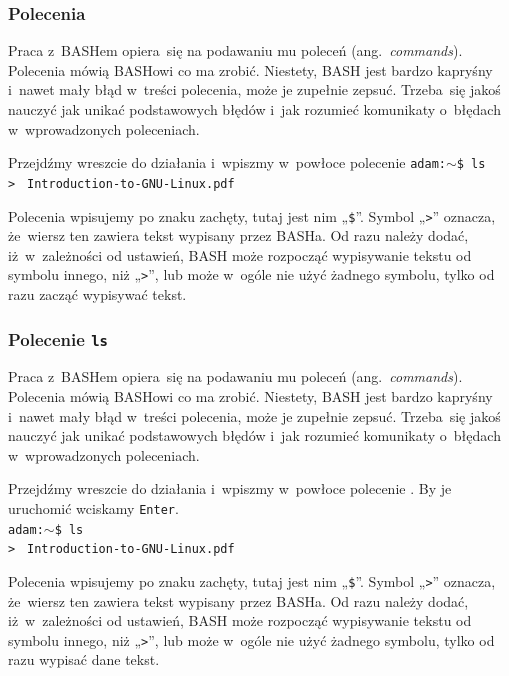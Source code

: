 \documentclass[10pt,t]{beamer}
\begin{document}
\begin{frame}
  \frametitle{Polecenia}


  Praca z~BASHem opiera~się na podawaniu mu poleceń
  (ang.~\textit{commands}). Polecenia mówią BASHowi co ma zrobić.
  Niestety, BASH jest bardzo kapryśny i~nawet mały błąd w~treści polecenia,
  może je zupełnie zepsuć. Trzeba~się jakoś nauczyć jak unikać podstawowych
  błędów i~jak rozumieć komunikaty o~błędach w~wprowadzonych poleceniach.

  Przejdźmy wreszcie do działania i~wpiszmy w~powłoce polecenie
  \texttt{adam:$\sim$\$ ls} \\
  \texttt{> } \quad
  \texttt{Introduction-to-GNU-Linux.pdf} \quad
  \texttt{}

  Polecenia wpisujemy po znaku zachęty, tutaj jest nim „\texttt{\$}”.
  Symbol „\texttt{>}” oznacza, że~wiersz ten zawiera tekst wypisany przez
  BASHa. Od razu należy dodać, iż~w~zależności od ustawień, BASH
  może rozpocząć wypisywanie tekstu od symbolu innego, niż „\texttt{>}”,
  lub może w~ogóle nie użyć żadnego symbolu, tylko od razu zacząć wypisywać
  tekst.

\end{frame}





\begin{frame}
  \frametitle{Polecenie \texttt{ls}}


  Praca z~BASHem opiera~się na podawaniu mu poleceń
  (ang.~\textit{commands}). Polecenia mówią BASHowi co ma zrobić.
  Niestety, BASH jest bardzo kapryśny i~nawet mały błąd w~treści polecenia,
  może je zupełnie zepsuć. Trzeba~się jakoś nauczyć jak unikać podstawowych
  błędów i~jak rozumieć komunikaty o~błędach w~wprowadzonych poleceniach.

  Przejdźmy wreszcie do działania i~wpiszmy w~powłoce polecenie
  . By je
  uruchomić wciskamy \texttt{Enter}. \\
  \texttt{adam:$\sim$\$ ls} \\
  \texttt{> } \quad
  \texttt{Introduction-to-GNU-Linux.pdf} \quad
  \texttt{}

  Polecenia wpisujemy po znaku zachęty, tutaj jest nim „\texttt{\$}”.
  Symbol „\texttt{>}” oznacza, że~wiersz ten zawiera tekst wypisany przez
  BASHa. Od razu należy dodać, iż~w~zależności od ustawień, BASH
  może rozpocząć wypisywanie tekstu od symbolu innego, niż „\texttt{>}”,
  lub może w~ogóle nie użyć żadnego symbolu, tylko od razu wypisać dane
  tekst.

\end{frame}
\end{document}
